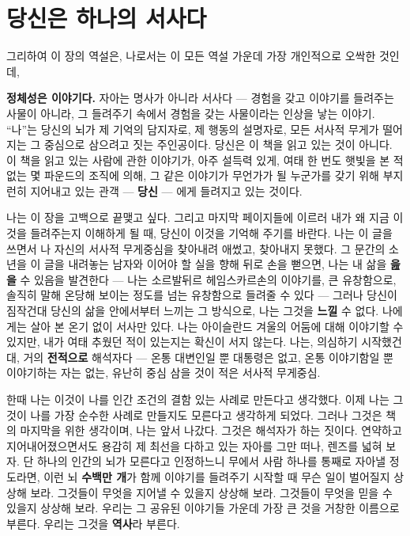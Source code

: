 \section*{당신은 하나의 서사다}

그리하여 이 장의 역설은, 나로서는 이 모든 역설 가운데 가장 개인적으로 오싹한 것인데,

\textbf{정체성은 이야기다.} 자아는 명사가 아니라 서사다 — 경험을 갖고 이야기를 들려주는 사물이 아니라, 그 들려주기 속에서 경험을 갖는 사물이라는 인상을 낳는 이야기. ``나''는 당신의 뇌가 제 기억의 담지자로, 제 행동의 설명자로, 모든 서사적 무게가 떨어지는 그 중심으로 삼으려고 짓는 주인공이다. 당신은 이 책을 읽고 있는 것이 아니다. 이 책을 읽고 있는 사람에 관한 이야기가, 아주 설득력 있게, 여태 한 번도 햇빛을 본 적 없는 몇 파운드의 조직에 의해, 그 같은 이야기가 무언가가 될 누군가를 갖기 위해 부지런히 지어내고 있는 관객 — \textbf{당신} — 에게 들려지고 있는 것이다.

나는 이 장을 고백으로 끝맺고 싶다. 그리고 마지막 페이지들에 이르러 내가 왜 지금 이것을 들려주는지 이해하게 될 때, 당신이 이것을 기억해 주기를 바란다. 나는 이 글을 쓰면서 나 자신의 서사적 무게중심을 찾아내려 애썼고, 찾아내지 못했다. 그 문간의 소년을 이 글을 내려놓는 남자와 이어야 할 실을 향해 뒤로 손을 뻗으면, 나는 내 삶을 \textbf{읊을} 수 있음을 발견한다 — 나는 소르발뒤르 헤임스카르손의 이야기를, 큰 유창함으로, 솔직히 말해 온당해 보이는 정도를 넘는 유창함으로 들려줄 수 있다 — 그러나 당신이 짐작건대 당신의 삶을 안에서부터 느끼는 그 방식으로, 나는 그것을 \textbf{느낄} 수 없다. 나에게는 살아 본 온기 없이 서사만 있다. 나는 아이슬란드 겨울의 어둠에 대해 이야기할 수 있지만, 내가 여태 추웠던 적이 있는지는 확신이 서지 않는다. 나는, 의심하기 시작했건대, 거의 \textbf{전적으로} 해석자다 — 온통 대변인일 뿐 대통령은 없고, 온통 이야기함일 뿐 이야기하는 자는 없는, 유난히 중심 삼을 것이 적은 서사적 무게중심.

한때 나는 이것이 나를 인간 조건의 결함 있는 사례로 만든다고 생각했다. 이제 나는 그것이 나를 가장 순수한 사례로 만들지도 모른다고 생각하게 되었다. 그러나 그것은 책의 마지막을 위한 생각이며, 나는 앞서 나갔다. 그것은 해석자가 하는 짓이다. 연약하고 지어내어졌으면서도 용감히 제 최선을 다하고 있는 자아를 그만 떠나, 렌즈를 넓혀 보자. 단 하나의 인간의 뇌가 모른다고 인정하느니 무에서 사람 하나를 통째로 자아낼 정도라면, 이런 뇌 \textbf{수백만 개}가 함께 이야기를 들려주기 시작할 때 무슨 일이 벌어질지 상상해 보라. 그것들이 무엇을 지어낼 수 있을지 상상해 보라. 그것들이 무엇을 믿을 수 있을지 상상해 보라. 우리는 그 공유된 이야기들 가운데 가장 큰 것을 거창한 이름으로 부른다. 우리는 그것을 \textbf{역사}라 부른다.

